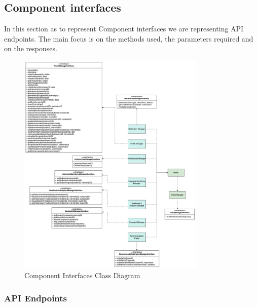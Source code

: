 % 
\clearpage
\subsection{Component interfaces}

In this section as to represent Component interfaces we are representing API endpoints. The main focus is on the methods used, the
parameters required and on the responses.\\ 

\begin{figure}[H]
\centering
\includegraphics[width=0.8\textwidth]{Images/component_interfaces_class_diagram.png}
\caption{\label{fig:metamodel4} Component Interfaces Class Diagram}
\end{figure}

\subsubsection{API Endpoints}

